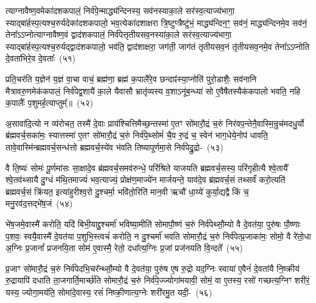 त्याग्नावैष्ण॒वमेका॑\-दश\-कपालं॒ निर्व॑पे॒न्माद्ध्य॑न्दिनस्य॒ सव॑नस्या\-का॒ले सर॑स्व॒त्याज्य॑भागा॒ स्याद्बा॑र्\mbox{}हस्प॒त्यश्च॒रुर्यदेका॑\-दश\-कपालो॒ भव॒त्येका॑\-दशाक्षरा त्रि॒ष्टुप्त्रैष्टु॑भं॒ माद्ध्य॑न्दिन॒ꣳ॒ सव॑नं॒ माद्ध्य॑न्दिनमे॒व सव॑नं॒ तेना᳚\-ऽऽ\-प्नोत्याग्नावैष्ण॒वं द्वाद॑श\-कपालं॒ निर्व॑पेत्तृतीय\-सव॒नस्या॑\-का॒ले सर॑स्व॒त्याज्य॑भागा॒ स्याद्बा॑र्\mbox{}ह\-स्प॒त्यश्च॒रुर्यद्द्वाद॑श\-कपालो॒ भव॑ति॒ द्वाद॑शाक्षरा॒ जग॑ती॒ जाग॑तं तृतीयसव॒नं तृ॑तीयसव॒नमे॒व तेना᳚\-ऽऽ\-प्नोति दे॒वता॑भिरे॒व दे॒वताः᳚~(५१)

प्रति॒चर॑ति य॒ज्ञेन॑ य॒ज्ञं वा॒चा वाचं॒ ब्रह्म॑णा॒ ब्रह्म॑ क॒पालै॑रे॒व छन्दाꣴ॑स्या॒प्नोति॑ पुरो॒डाशैः॒ सव॑नानि मैत्रावरु॒णमेक॑कपालं॒ निर्व॑पेद्व॒शायै॑ का॒ले यैवासौ भ्रातृ॑व्यस्य व॒शा\-ऽनू॑ब॒न्ध्या॑ सो ए॒वैषैतस्यैक॑कपालो भवति॒ नहि क॒पालैः᳚ प॒शुमर्\mbox{}ह॒त्याप्तुम्᳚॥~(५२)

{\anuvakamend[{ब्रह्म॑णै॒वैन॑म॒भिच॑रति य॒ज्ञो न तावे॒वास्ये᳚न्द्रि॒यमा᳚प्नोति दे॒वताः᳚ स॒प्तत्रिꣳ॑शच्च।}]}

अ॒सावा॑दि॒त्यो न व्य॑रोचत॒ तस्मै॑ दे॒वाः प्राय॑श्चित्ति\-मैच्छ॒न्तस्मा॑ ए॒तꣳ सो॑मारौ॒द्रं च॒रुं निर॑वप॒न्तेनै॒वास्मि॒न्रुच॑मद\-धु॒र्यो ब्र॑ह्मवर्च॒सका॑मः॒ स्यात्तस्मा॑ ए॒तꣳ सो॑मारौ॒द्रं च॒रुं निर्व॑पे॒थ्सोमं॑ चै॒व रु॒द्रं च॒ स्वेन॑ भाग॒धेये॒नोप॑ धावति॒ तावे॒वास्मि॑न्ब्रह्मवर्च॒सन्ध॑त्तो ब्रह्मवर्च॒स्ये॑व भ॑वति तिष्यापूर्णमा॒से निर्व॑पेद्रु॒द्रो-~(५३)

वै ति॒ष्यः॑ सोमः॑ पू॒र्णमा॑सः सा॒क्षादे॒व ब्र॑ह्मवर्च॒समव॑\-रुन्धे॒ परि॑श्रिते याजयति ब्रह्मवर्च॒सस्य॒ परि॑गृहीत्यै श्वे॒तायै᳚ श्वे॒तव॑थ्सायै दु॒ग्धं म॑थि॒तमाज्यं॑ भव॒त्याज्यं॒ प्रोक्ष॑ण॒माज्ये॑न मार्जयन्ते॒ याव॑दे॒व ब्र॑ह्मवर्च॒सं तथ्सर्वं॑ करो॒त्यति॑ ब्रह्मवर्च॒सं क्रि॑यत॒ इत्या॑हुरीश्व॒रो दु॒श्चर्मा॒ भवि॑तो॒रिति॑ मान॒वी ऋचौ॑ धा॒य्ये॑ कुर्या॒द्यद्वै किं च॒ मनु॒रव॑द॒त्तद्भे॑ष॒जं~(५४)

भे॑ष॒जमे॒वास्मै॑ करोति॒ यदि॑ बिभी॒याद्दु॒श्चर्मा॑ भविष्या॒मीति॑ सोमापौ॒ष्णं च॒रुं निर्व॑पेथ्सौ॒म्यो वै दे॒वत॑या॒ पुरु॑षः पौ॒ष्णाः प॒शवः॒ स्वयै॒वास्मै॑ दे॒वत॑या प॒शुभि॒स्त्वचं॑ करोति॒ न दु॒श्चर्मा॑ भवति सोमारौ॒द्रं च॒रुं निर्व॑पेत्प्र॒जाका॑मः॒ सोमो॒ वै रे॑तो॒धा अ॒ग्निः प्र॒जानां᳚ प्रजनयि॒ता सोम॑ ए॒वास्मै॒ रेतो॒ दधा᳚त्य॒ग्निः प्र॒जां प्रज॑नयति वि॒न्दते᳚~(५५)

प्र॒जाꣳ सो॑मारौ॒द्रं च॒रुं निर्व॑पेदभि॒चर᳚न्थ्सौ॒म्यो वै दे॒वत॑या॒ पुरु॑ष ए॒ष रु॒द्रो यद॒ग्निः स्वाया॑ ए॒वैनं॑ दे॒वता॑यै नि॒ष्क्रीय॑ रु॒द्रायापि॑ दधाति ता॒जगार्ति॒मार्च्छ॑ति सोमारौ॒द्रं च॒रुं निर्व॑पे॒ज्ज्योगा॑मयावी॒ सोमं॒ वा ए॒तस्य॒ रसो॑ गच्छत्य॒ग्निꣳ शरी॑रं॒ यस्य॒ ज्योगा॒मय॑ति॒ सोमा॑दे॒वास्य॒ रसं॑ निष्क्री॒णात्य॒ग्नेः शरी॑रमु॒त यदी॒-~(५६)

